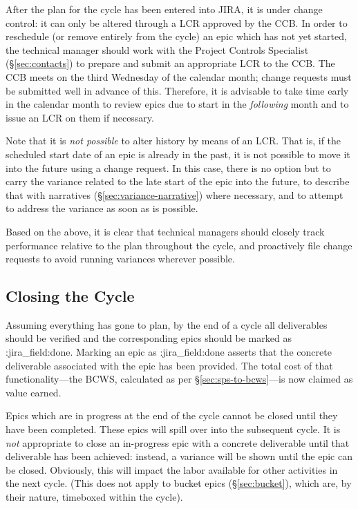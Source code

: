 After the plan for the cycle has been entered into JIRA, it is under
change control: it can only be altered through a LCR approved by the
CCB. In order to reschedule (or remove entirely from the cycle) an epic
which has not yet started, the technical manager should work with the
Project Controls Specialist (\S\ref{sec:contacts}) to
prepare and submit an appropriate LCR to the CCB. The CCB meets on the
third Wednesday of the calendar month; change requests must be submitted
well in advance of this. Therefore, it is advisable to take time early
in the calendar month to review epics due to start in the
\emph{following} month and to issue an LCR on them if necessary.

Note that it is \emph{not possible} to alter history by means of an LCR.
That is, if the scheduled start date of an epic is already in the past,
it is not possible to move it into the future using a change request. In
this case, there is no option but to carry the variance related to the
late start of the epic into the future, to describe that with narratives
(\S\ref{sec:variance-narrative}) where necessary, and to
attempt to address the variance as soon as is possible.

Based on the above, it is clear that technical managers should closely
track performance relative to the plan throughout the cycle, and
proactively file change requests to avoid running variances wherever
possible.

\subsection{Closing the Cycle}
\label{sec:cycle-close}

Assuming everything has gone to plan, by the end of a cycle all
deliverables should be verified and the corresponding epics should be
marked as :jira\_field:done. Marking an epic as :jira\_field:done
asserts that the concrete deliverable associated with the epic has been
provided. The total cost of that functionality---the BCWS, calculated as
per \S\ref{sec:sps-to-bcws}---is now claimed as value earned.

Epics which are in progress at the end of the cycle cannot be closed
until they have been completed. These epics will spill over into the
subsequent cycle. It is \emph{not} appropriate to close an in-progress
epic with a concrete deliverable until that deliverable has been
achieved: instead, a variance will be shown until the epic can be
closed. Obviously, this will impact the labor available for other
activities in the next cycle. (This does not apply to
bucket epics (\S\ref{sec:bucket}), which are, by their
nature, timeboxed within the cycle).

